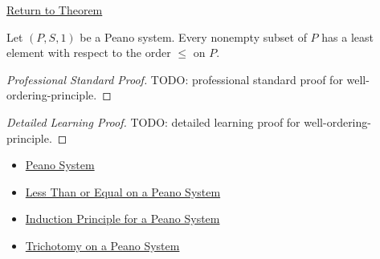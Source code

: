 \newpage
{}
\label{prf:well-ordering-principle}

\begin{remark*}[Return]
\hyperref[thm:well-ordering-principle]{Return to Theorem}
\end{remark*}

\begin{theorem*}
Let $(P,S,1)$ be a Peano system. Every nonempty subset of $P$ has a least
element with respect to the order $\le$ on $P$.
\end{theorem*}

\begin{proof}[Professional Standard Proof]
\LRAProofBodyStart
TODO: professional standard proof for well-ordering-principle.
\end{proof}

\begin{proof}[Detailed Learning Proof]
\LRAProofBodyStart
TODO: detailed learning proof for well-ordering-principle.
\end{proof}

\begin{remark*}
\end{remark*}

\begin{dependencies}
\begin{itemize}
  \item \hyperref[def:peano-system]{Peano System}
  \item \hyperref[def:less-than-or-equal-on-peano-system]{Less Than or Equal on a Peano System}
  \item \hyperref[thm:induction-principle-for-peano-system]{Induction Principle for a Peano System}
  \item \hyperref[thm:trichotomy-on-peano-system]{Trichotomy on a Peano System}
\end{itemize}
\end{dependencies}

\clearpage
